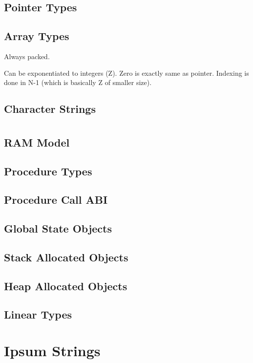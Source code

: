 \documentclass[11pt]{book}
\begin{document}
\section{Pointer Types}
\section{Array Types}

Always packed.

Can be exponentiated to integers (Z). Zero is exactly same as pointer.
Indexing is done in N-1 (which is basically Z of smaller size).

\section{Character Strings}

\chapter{}
\section{RAM Model}
\section{Procedure Types}
\section{Procedure Call ABI}
\section{Global State Objects}
\section{Stack Allocated Objects}
\section{Heap Allocated Objects}
\section{Linear Types}



\chapter{Ipsum Strings}
\end{document}
